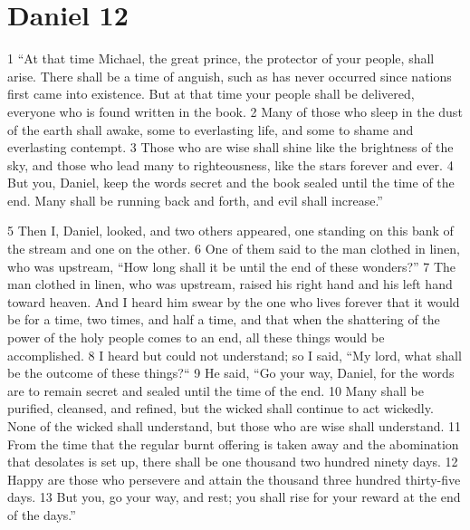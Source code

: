 \chapter{Daniel 12}
\label{ch:daniel12}

1 ``At that time Michael, the great prince, the protector of your people, shall 
arise. There shall be a time of anguish, such as has never occurred since nations first 
came into existence. But at that time your people shall be delivered, everyone 
who is found written in the book. 2 Many of those who sleep in the dust of the 
earth shall awake, some to everlasting life, and some to shame and everlasting 
contempt. 3 Those who are wise shall shine like the brightness of the sky, and 
those who lead many to righteousness, like the stars forever and ever. 4 But you,
Daniel, keep the words secret and the book sealed until the time of the end. 
Many shall be running back and forth, and evil shall increase.''

5 Then I, Daniel, looked, and two others appeared, one standing on this bank of
the stream and one on the other. 6 One of them said to the man clothed in linen,
who was upstream, ``How long shall it be until the end of these wonders?'' 7 
The man clothed in linen, who was upstream, raised his right hand and his left 
hand toward heaven. And I heard him swear by the one who lives forever that it 
would be for a time, two times, and half a time, and that when the shattering 
of the power of the holy people comes to an end, all these things would be 
accomplished. 8 I heard but could not understand; so I said, ``My lord, what 
shall be the outcome of these things?`` 9 He said, ``Go your way, Daniel, for 
the words are to remain secret and sealed until the time of the end. 10 Many 
shall be purified, cleansed, and refined, but the wicked shall continue to act 
wickedly. None of the wicked shall understand, but those who are wise shall 
understand. 11 From the time that the regular burnt offering is taken away and 
the abomination that desolates is set up, there shall be one thousand two 
hundred ninety days. 12 Happy are those who persevere and attain the thousand 
three hundred thirty-five days. 13 But you, go your way, and rest; you shall 
rise for your reward at the end of the days.''

